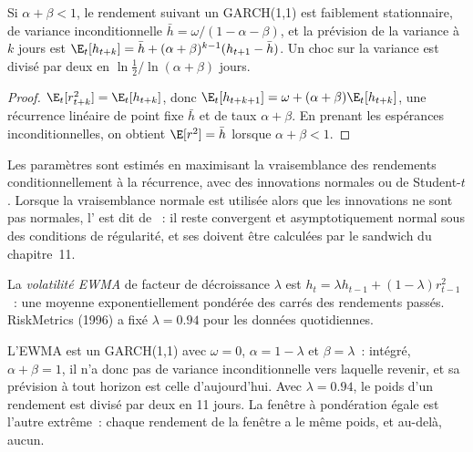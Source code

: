 \begin{proposition}\label{prop:qm:volatility-models:garch}
Si $\alpha + \beta < 1$, le rendement suivant un GARCH(1,1) est faiblement stationnaire, de variance inconditionnelle $\bar h = \omega/(1 - \alpha - \beta)$, et la
prévision de la variance à $k$ jours est $\E_t[h_{t+k}] = \bar h + (\alpha + \beta)^{k-1}(h_{t+1} - \bar h)$. Un choc sur la variance est divisé par deux en $\ln\frac12/\ln(\alpha + \beta)$
jours.
\end{proposition}

\begin{proof}
$\E_t[r_{t+k}^2] = \E_t[h_{t+k}]$, donc $\E_t[h_{t+k+1}] = \omega + (\alpha + \beta)\E_t[h_{t+k}]$, une récurrence linéaire de point fixe $\bar h$ et de taux $\alpha + \beta$.
En prenant les espérances inconditionnelles, on obtient $\E[r^2] = \bar h$ lorsque $\alpha + \beta < 1$.
\end{proof}

Les paramètres sont estimés en maximisant la vraisemblance des rendements conditionnellement à la récurrence, avec des innovations normales ou de Student-$t$. Lorsque la
vraisemblance normale est utilisée alors que les innovations ne sont pas normales, l' est dit de ~: il reste convergent et
asymptotiquement normal sous des conditions de régularité, et ses  doivent être calculées par le sandwich du chapitre~11.

\begin{definition}\label{def:qm:volatility-models:ewma}
La \emph{volatilité EWMA} de facteur de décroissance $\lambda$ est $h_t = \lambda h_{t-1} + (1 - \lambda)r_{t-1}^2$~: une moyenne exponentiellement pondérée des carrés
des rendements passés. RiskMetrics (1996) a fixé $\lambda = 0.94$ pour les données quotidiennes.
\end{definition}

L'EWMA est un GARCH(1,1) avec $\omega = 0$, $\alpha = 1 - \lambda$ et $\beta = \lambda$~: intégré, $\alpha + \beta = 1$, il n'a donc pas de variance inconditionnelle vers laquelle revenir, et
sa prévision à tout horizon est celle d'aujourd'hui. Avec $\lambda = 0.94$, le poids d'un rendement est divisé par deux en 11 jours. La fenêtre à pondération égale est l'autre extrême~:
chaque rendement de la fenêtre a le même poids, et au-delà, aucun.

